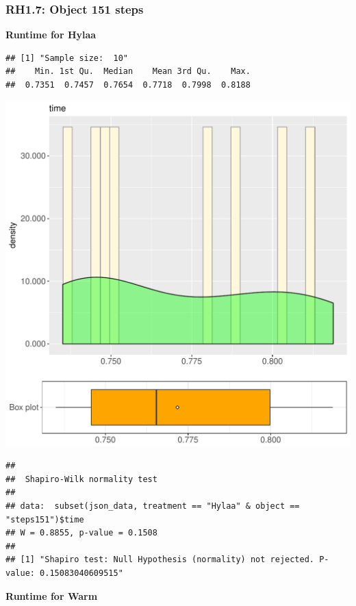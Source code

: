 \documentclass{article}\usepackage[]{graphicx}\usepackage[]{color}
\makeatletter
\def\maxwidth{ %
  \ifdim\Gin@nat@width>\linewidth
    \linewidth
  \else
    \Gin@nat@width
  \fi
}
\newenvironment{kframe}{%
 \def\at@end@of@kframe{}%
 \ifinner\ifhmode%
  \def\at@end@of@kframe{\end{minipage}}%
  \begin{minipage}{\columnwidth}%
 \fi\fi%
 \def\FrameCommand##1{\hskip\@totalleftmargin \hskip-\fboxsep
 \colorbox{shadecolor}{##1}\hskip-\fboxsep
     \hskip-\linewidth \hskip-\@totalleftmargin \hskip\columnwidth}%
 \MakeFramed {\advance\hsize-\width
   \@totalleftmargin\z@ \linewidth\hsize
   \@setminipage}}%
 {\par\unskip\endMakeFramed%
 \at@end@of@kframe}
\newenvironment{knitrout}{}{} %
\makeatother
\begin{document}
\subsubsection{RH1.7: Object 151 steps}

 \textbf{Runtime for Hylaa}
\begin{knitrout}
\color{fgcolor}\begin{kframe}
\begin{verbatim}
## [1] "Sample size:  10"
##    Min. 1st Qu.  Median    Mean 3rd Qu.    Max. 
##  0.7351  0.7457  0.7654  0.7718  0.7998  0.8188
\end{verbatim}
\end{kframe}
\includegraphics[width=\maxwidth]{figure/RH1_Hylaa_steps151-1} 
\begin{kframe}\begin{verbatim}
## 
## 	Shapiro-Wilk normality test
## 
## data:  subset(json_data, treatment == "Hylaa" & object == "steps151")$time
## W = 0.8855, p-value = 0.1508
## 
## [1] "Shapiro test: Null Hypothesis (normality) not rejected. P-value: 0.15083040609515"
\end{verbatim}
\end{kframe}
\end{knitrout}
 \textbf{Runtime for Warm}
\end{document}
